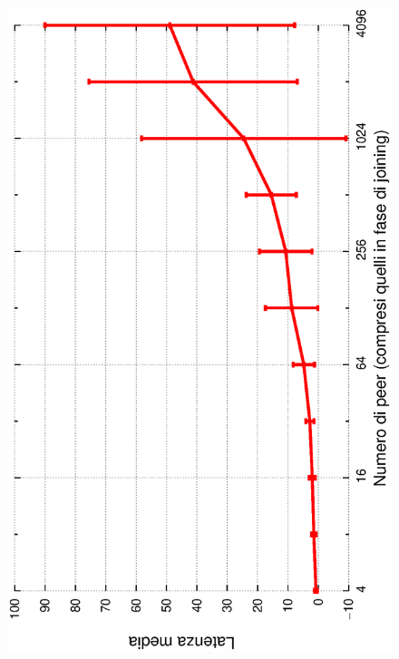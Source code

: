 \documentclass[prodmode,acmtap]{acmlarge}
\begin{document}
\begin{figure}
\includegraphics[scale=.32, angle=-90]{imgs/relink-conc-stability2-hops.eps}

\end{figure}
\end{document}
